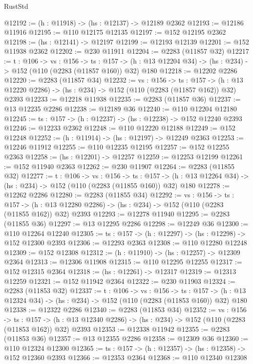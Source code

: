 \begin{lexlean}{RustStd}
\begin{coremodule}
@12192 := (h : @11918) -> (hs : @12137) -> @12189 @2362
@12193 := @12186 @11916
@12195 := @110 @12175 @12135
@12197 := @152 @12195 @2362
@12198 := (hs : @12141) -> @12197
@12199 := @12193 @12139
@12201 := @152 @11938 @2362
@12202 := @230 @11911
@12204 := @2283 (@11857 @32)
@12217 := {t : @106} ->
  {vs : @156} ->
  {ts : @157} -> (h : @13 @12204 @34) -> (hs : @234) -> @152 (@110 (@2283 (@11857 @160)) @32) @180
@12218 := @12202 @2286
@12220 := @2283 (@11857 @34)
@12232 := {vs : @156} ->
  {ts : @157} ->
  (h : @13 @12220 @2286) -> (hs : @234) -> @152 (@110 (@2283 (@11857 @162)) @32) @2393
@12233 := @12218 @11938
@12235 := @2283 (@11857 @36)
@12237 := @13 @12235 @2286
@12238 := @12189 @36
@12240 := @110 @12204 @12180
@12245 := {ts : @157} -> (h : @12237) -> (hs : @12238) -> @152 @12240 @2393
@12246 := @12233 @2362
@12248 := @110 @12220 @12188
@12249 := @152 @12248
@12252 := (h : @11914) -> (hs : @12197) -> @12249 @2363
@12253 := @12246 @11912
@12255 := @110 @12235 @12195
@12257 := @152 @12255 @2363
@12258 := (hs : @12201) -> @12257
@12259 := @12253 @12199
@12261 := @152 @11940 @2363
@12262 := @230 @11907
@12264 := @2283 (@11855 @32)
@12277 := {t : @106} ->
  {vs : @156} ->
  {ts : @157} -> (h : @13 @12264 @34) -> (hs : @234) -> @152 (@110 (@2283 (@11855 @160)) @32) @180
@12278 := @12262 @2286
@12280 := @2283 (@11855 @34)
@12292 := {vs : @156} ->
  {ts : @157} ->
  (h : @13 @12280 @2286) -> (hs : @234) -> @152 (@110 (@2283 (@11855 @162)) @32) @2393
@12293 := @12278 @11940
@12295 := @2283 (@11855 @36)
@12297 := @13 @12295 @2286
@12298 := @12249 @36
@12300 := @110 @12264 @12240
@12305 := {ts : @157} -> (h : @12297) -> (hs : @12298) -> @152 @12300 @2393
@12306 := @12293 @2363
@12308 := @110 @12280 @12248
@12309 := @152 @12308
@12312 := (h : @11910) -> (hs : @12257) -> @12309 @2364
@12313 := @12306 @11908
@12315 := @110 @12295 @12255
@12317 := @152 @12315 @2364
@12318 := (hs : @12261) -> @12317
@12319 := @12313 @12259
@12321 := @152 @11942 @2364
@12322 := @230 @11903
@12324 := @2283 (@11853 @32)
@12337 := {t : @106} ->
  {vs : @156} ->
  {ts : @157} -> (h : @13 @12324 @34) -> (hs : @234) -> @152 (@110 (@2283 (@11853 @160)) @32) @180
@12338 := @12322 @2286
@12340 := @2283 (@11853 @34)
@12352 := {vs : @156} ->
  {ts : @157} ->
  (h : @13 @12340 @2286) -> (hs : @234) -> @152 (@110 (@2283 (@11853 @162)) @32) @2393
@12353 := @12338 @11942
@12355 := @2283 (@11853 @36)
@12357 := @13 @12355 @2286
@12358 := @12309 @36
@12360 := @110 @12324 @12300
@12365 := {ts : @157} -> (h : @12357) -> (hs : @12358) -> @152 @12360 @2393
@12366 := @12353 @2364
@12368 := @110 @12340 @12308

\end{coremodule}
\end{lexlean}
